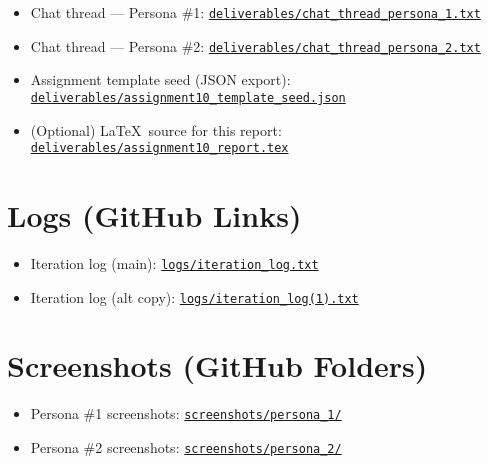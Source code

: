 \documentclass[11pt]{article}
\begin{document}
\begin{itemize}[leftmargin=1.2em]
  \item Chat thread — Persona \#1: \href{https://github.com/PreFrontalCorporate/assignment-10-chatbot/blob/main/deliverables/chat_thread_persona_1.txt}{\texttt{deliverables/chat\_thread\_persona\_1.txt}}
  \item Chat thread — Persona \#2: \href{https://github.com/PreFrontalCorporate/assignment-10-chatbot/blob/main/deliverables/chat_thread_persona_2.txt}{\texttt{deliverables/chat\_thread\_persona\_2.txt}}
  \item Assignment template seed (JSON export): \href{https://github.com/PreFrontalCorporate/assignment-10-chatbot/blob/main/deliverables/assignment10_template_seed.json}{\texttt{deliverables/assignment10\_template\_seed.json}}
  \item (Optional) \LaTeX\ source for this report: \href{https://github.com/PreFrontalCorporate/assignment-10-chatbot/blob/main/deliverables/assignment10_report.tex}{\texttt{deliverables/assignment10\_report.tex}}
\end{itemize}

\section*{Logs (GitHub Links)}
\begin{itemize}[leftmargin=1.2em]
  \item Iteration log (main): \href{https://github.com/PreFrontalCorporate/assignment-10-chatbot/blob/main/logs/iteration_log.txt}{\texttt{logs/iteration\_log.txt}}
  \item Iteration log (alt copy): \href{https://github.com/PreFrontalCorporate/assignment-10-chatbot/blob/main/logs/iteration_log(1).txt}{\texttt{logs/iteration\_log(1).txt}}
\end{itemize}

\section*{Screenshots (GitHub Folders)}
\begin{itemize}[leftmargin=1.2em]
  \item Persona \#1 screenshots: \href{https://github.com/PreFrontalCorporate/assignment-10-chatbot/tree/main/screenshots/persona_1}{\texttt{screenshots/persona\_1/}}
  \item Persona \#2 screenshots: \href{https://github.com/PreFrontalCorporate/assignment-10-chatbot/tree/main/screenshots/persona_2}{\texttt{screenshots/persona\_2/}}
\end{itemize}
\end{document}
